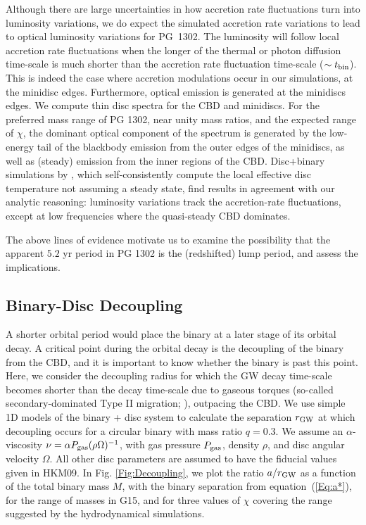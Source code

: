 Although there are large uncertainties in how accretion rate fluctuations turn
into luminosity variations, we do expect the simulated accretion rate variations to lead to optical luminosity variations for PG~1302. The luminosity will follow local accretion rate fluctuations when the longer of the thermal or photon diffusion time-scale is much shorter than the accretion rate fluctuation time-scale ($\sim t_{\rm bin}$). This is indeed the case where accretion modulations occur in our simulations, at the minidisc edges. Furthermore, optical emission is generated at the minidiscs edges. We compute thin disc spectra for the CBD and minidiscs. For the preferred mass range of PG 1302, near unity mass ratios, and the expected range of $\chi$, the dominant optical component of the spectrum is generated by the low-energy tail of the blackbody emission from the outer edges of the minidiscs, as well as (steady) emission from the inner regions of the CBD. Disc+binary simulations by \cite{Farris:2015:Cool}, which self-consistently compute the local effective disc temperature not assuming a steady state, find results in agreement with our analytic reasoning: luminosity variations track the accretion-rate fluctuations, except at low frequencies where the quasi-steady CBD dominates.







The above lines of evidence motivate us to examine the possibility that the
apparent $5.2$ yr period in PG 1302 is the (redshifted) lump period,
and assess the implications.


\subsection{Binary-Disc Decoupling}
\label{SS:Decoupling}

A shorter orbital period would place the binary at a later stage of
its orbital decay.  A critical point during the orbital decay is the
decoupling of the binary from the CBD, and it is important to know
whether the binary is past this point. 
Here, we consider the decoupling radius for which the GW decay time-scale becomes shorter than the decay time-scale due to gaseous torques (so-called secondary-dominated Type II migration; \citealt{SyerClarke95}), outpacing the CBD.
We use simple 1D models of the binary
+ disc system \citep[][hereafter HKM09]{HKM09} to calculate the
separation $r_{\rm GW}$ at which decoupling occurs for a circular
binary with mass ratio $q=0.3$. We assume an $\alpha$-viscosity $\nu =
\alpha P_{\rm{gas}} (\rho\Omega)^{-1}$, with gas pressure
$P_{\rm{gas}}$, density $\rho$, and disc angular velocity $\Omega$. All other disc parameters are assumed to have the
fiducial values given in HKM09.  In Fig. \ref{Fig:Decoupling}, we plot
the ratio $a/r_{\rm{GW}}$ as a function of the total binary mass $M$, with the binary separation from equation~(\ref{Eq:a*}), for
the range of masses in G15, and for three values of $\chi$ covering
the range suggested by the hydrodynamical simulations.

